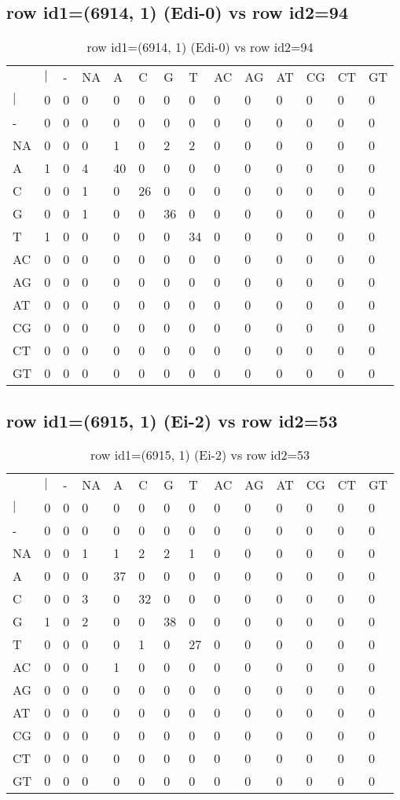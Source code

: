 \subsection{row id1=(6914, 1) (Edi-0) vs row id2=94}
\begin{center}
\begin{longtable}{|l|l|l|l|l|l|l|l|l|l|l|l|l|l|}
\caption{row id1=(6914, 1) (Edi-0) vs row id2=94} \label{table_dm90}\\
\hline
\\
\hline
&$|$&-&NA&A&C&G&T&AC&AG&AT&CG&CT&GT\\
$|$&0&0&0&0&0&0&0&0&0&0&0&0&0\\
-&0&0&0&0&0&0&0&0&0&0&0&0&0\\
NA&0&0&0&1&0&2&2&0&0&0&0&0&0\\
A&1&0&4&40&0&0&0&0&0&0&0&0&0\\
C&0&0&1&0&26&0&0&0&0&0&0&0&0\\
G&0&0&1&0&0&36&0&0&0&0&0&0&0\\
T&1&0&0&0&0&0&34&0&0&0&0&0&0\\
AC&0&0&0&0&0&0&0&0&0&0&0&0&0\\
AG&0&0&0&0&0&0&0&0&0&0&0&0&0\\
AT&0&0&0&0&0&0&0&0&0&0&0&0&0\\
CG&0&0&0&0&0&0&0&0&0&0&0&0&0\\
CT&0&0&0&0&0&0&0&0&0&0&0&0&0\\
GT&0&0&0&0&0&0&0&0&0&0&0&0&0\\
\hline
\end{longtable}
\end{center}

\subsection{row id1=(6915, 1) (Ei-2) vs row id2=53}
\begin{center}
\begin{longtable}{|l|l|l|l|l|l|l|l|l|l|l|l|l|l|}
\caption{row id1=(6915, 1) (Ei-2) vs row id2=53} \label{table_dm92}\\
\hline
\\
\hline
&$|$&-&NA&A&C&G&T&AC&AG&AT&CG&CT&GT\\
$|$&0&0&0&0&0&0&0&0&0&0&0&0&0\\
-&0&0&0&0&0&0&0&0&0&0&0&0&0\\
NA&0&0&1&1&2&2&1&0&0&0&0&0&0\\
A&0&0&0&37&0&0&0&0&0&0&0&0&0\\
C&0&0&3&0&32&0&0&0&0&0&0&0&0\\
G&1&0&2&0&0&38&0&0&0&0&0&0&0\\
T&0&0&0&0&1&0&27&0&0&0&0&0&0\\
AC&0&0&0&1&0&0&0&0&0&0&0&0&0\\
AG&0&0&0&0&0&0&0&0&0&0&0&0&0\\
AT&0&0&0&0&0&0&0&0&0&0&0&0&0\\
CG&0&0&0&0&0&0&0&0&0&0&0&0&0\\
CT&0&0&0&0&0&0&0&0&0&0&0&0&0\\
GT&0&0&0&0&0&0&0&0&0&0&0&0&0\\
\hline
\end{longtable}
\end{center}

